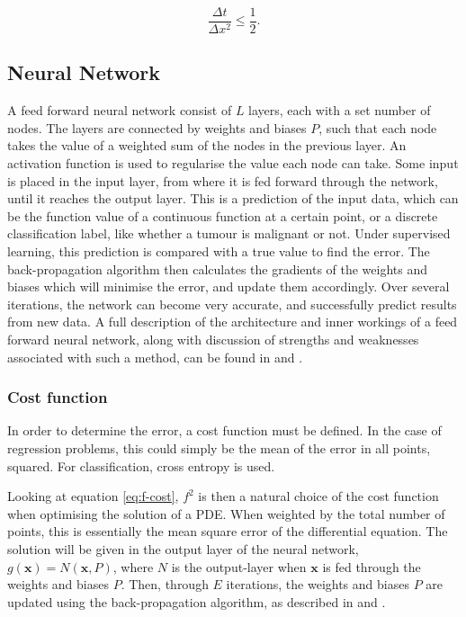 \documentclass[multicolumn, 9pt]{extarticle}
\begin{document}
\begin{equation}\label{eq:stability_crit}
	\frac{\Delta t}{\Delta x^{2}} \le \frac{1}{2}.
\end{equation}

\subsection{Neural Network}
A feed forward neural network consist of $L$ layers, each with a set number of nodes. The layers are connected by weights and biases $P$, such that each node takes the value of a weighted sum of the nodes in the previous layer. An activation function is used to regularise the value each node can take. Some input is placed in the input layer, from where it is fed forward through the network, until it reaches the output layer. This is a prediction of the input data, which can be the function value of a continuous function at a certain point, or a discrete classification label, like whether a tumour is malignant or not. Under supervised learning, this prediction is compared with a true value to find the error. The back-propagation algorithm then calculates the gradients of the weights and biases which will minimise the error, and update them accordingly. Over several iterations, the network can become very accurate, and successfully predict results from new data. A full description of the architecture and inner workings of a feed forward neural network, along with discussion of strengths and weaknesses associated with such a method, can be found in \cite{p2S} and \cite{p2HO}.

\subsubsection{Cost function}
In order to determine the error, a cost function must be defined. In the case of regression problems, this could simply be the mean of the error in all points, squared. For classification, cross entropy is used.

Looking at equation \eqref{eq:f-cost}, $f^2$ is then a natural choice of the cost function when optimising the solution of a PDE. When weighted by the total number of points, this is essentially the mean square error of the differential equation. The solution will be given in the output layer of the neural network, $g(\mathbf{x}) = N(\mathbf{x}, P)$, where $N$ is the output-layer when $\mathbf{x}$ is fed through the weights and biases $P$.
Then, through $E$ iterations, the weights and biases $P$ are updated using the back-propagation algorithm, as described in \cite{p2S} and \cite{p2HO}.
\end{document}
